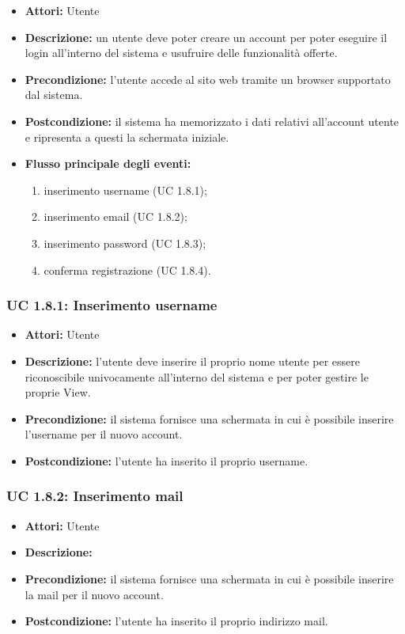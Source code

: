 \begin{itemize}
\item \textbf{Attori:} Utente
\item \textbf{Descrizione:} un utente deve poter creare un account per poter eseguire il login
all’interno del sistema e usufruire delle funzionalità offerte.
\item \textbf{Precondizione:} l'utente accede al sito web tramite un browser supportato
dal sistema.
\item \textbf{Postcondizione:} il sistema ha memorizzato i dati relativi all’account utente e
ripresenta a questi la schermata iniziale.
\item \textbf{Flusso principale degli eventi:}

\begin{enumerate}
\item inserimento username (UC 1.8.1);
\item inserimento email (UC 1.8.2);
\item inserimento password (UC 1.8.3);
\item conferma registrazione (UC 1.8.4).
\end{enumerate}

\end{itemize}

\subsubsection{UC 1.8.1: Inserimento username}

\begin{itemize}
\item \textbf{Attori:} Utente
\item \textbf{Descrizione:} l'utente deve inserire il proprio nome utente per essere riconoscibile univocamente all'interno del sistema e per poter gestire le proprie View.
\item \textbf{Precondizione:} il sistema fornisce una schermata in cui è possibile inserire l'username per il nuovo account.
\item \textbf{Postcondizione:} l'utente ha inserito il proprio username.
\end{itemize}

\subsubsection{UC 1.8.2: Inserimento mail}

\begin{itemize}
\item \textbf{Attori:} Utente
\item \textbf{Descrizione:} 
\item \textbf{Precondizione:} il sistema fornisce una schermata in cui è possibile inserire la mail per il nuovo account.
\item \textbf{Postcondizione:} l'utente ha inserito il proprio indirizzo mail.
\end{itemize}

